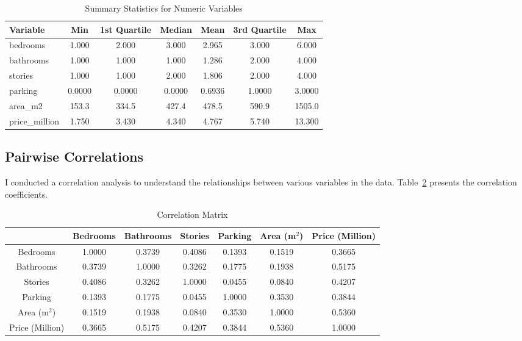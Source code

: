 \documentclass[10pt]{article}
\begin{document}
\begin{table}[H]
  \centering
  
  \begin{tabular}{lcccccc}
    \toprule
    Variable & Min & 1st Quartile & Median & Mean & 3rd Quartile & Max \\
    \midrule
    bedrooms & 1.000 & 2.000 & 3.000 & 2.965 & 3.000 & 6.000 \\
    bathrooms & 1.000 & 1.000 & 1.000 & 1.286 & 2.000 & 4.000 \\
    stories & 1.000 & 1.000 & 2.000 & 1.806 & 2.000 & 4.000 \\
    parking & 0.0000 & 0.0000 & 0.0000 & 0.6936 & 1.0000 & 3.0000 \\
    area\_m2 & 153.3 & 334.5 & 427.4 & 478.5 & 590.9 & 1505.0 \\
    price\_million & 1.750 & 3.430 & 4.340 & 4.767 & 5.740 & 13.300 \\
    \bottomrule
  \end{tabular}
  \caption{Summary Statistics for Numeric Variables}
  \label{tab:summary-stats}
\end{table}

\subsection{Pairwise Correlations}

I conducted a correlation analysis to understand the relationships between various variables in the data. Table~\ref{tab:3} presents the correlation coefficients. 

\begin{table}[H]
\centering
\begin{tabular}{@{}ccccccc@{}}
\toprule
 & Bedrooms & Bathrooms & Stories & Parking & Area (m$^2$) & Price (Million) \\ \midrule
Bedrooms & 1.0000 & 0.3739 & 0.4086 & 0.1393 & 0.1519 & 0.3665 \\
Bathrooms & 0.3739 & 1.0000 & 0.3262 & 0.1775 & 0.1938 & 0.5175 \\
Stories & 0.4086 & 0.3262 & 1.0000 & 0.0455 & 0.0840 & 0.4207 \\
Parking & 0.1393 & 0.1775 & 0.0455 & 1.0000 & 0.3530 & 0.3844 \\
Area (m$^2$) & 0.1519 & 0.1938 & 0.0840 & 0.3530 & 1.0000 & 0.5360 \\
Price (Million) & 0.3665 & 0.5175 & 0.4207 & 0.3844 & 0.5360 & 1.0000 \\ \bottomrule
\end{tabular}
\caption{Correlation Matrix}
\label{tab:3}
\end{table}
\end{document}
